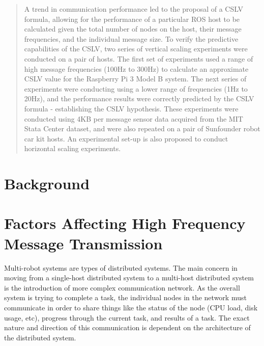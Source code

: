\documentclass{l4proj}
\begin{document}
\begin{abstract}
A trend in communication performance led to the proposal of a CSLV formula, allowing for the performance of a particular ROS host to be calculated given the total number of nodes on the host, their message frequencies, and the individual message size. To verify the predictive capabilities of the CSLV, two series of vertical scaling experiments were conducted on a pair of hosts. The first set of experiments used a range of high message frequencies (100Hz to 300Hz) to calculate an approximate CSLV value for the Raspberry Pi 3 Model B system. The next series of experiments were conducting using a lower range of frequencies (1Hz to 20Hz), and the performance results were correctly predicted by the CSLV formula - establishing the CSLV hypothesis. These experiments were conducted using 4KB per message sensor data acquired from the MIT Stata Center dataset, and were also repeated on a pair of Sunfounder robot car kit hosts. An experimental set-up is also proposed to conduct horizontal scaling experiments.

\end{abstract}

\educationalconsent
%
%
\tableofcontents

\pagebreak
{}



\chapter{Background}
\label{background-chapter}









\chapter{Factors Affecting High Frequency Message Transmission}
\label{communication-chapter}

Multi-robot systems are types of distributed systems. The main concern in moving from a single-host distributed system to a multi-host distributed system is the introduction of more complex communication network. As the overall system is trying to complete a task, the individual nodes in the network must communicate in order to share things like the status of the node (CPU load, disk usage, etc), progress through the current task, and results of a task. The exact nature and direction of this communication is dependent on the architecture of the distributed system.
\end{document}
